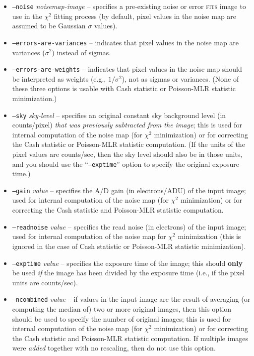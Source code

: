 \documentclass[10pt,a4paper,article]{memoir}
\newcommand{\chisquare}{\ensuremath{\chi^{2}}}
\begin{document}
\begin{itemize}
\item \texttt{--noise} \textit{noisemap-image} -- specifies a pre-existing noise
or error \textsc{fits} image to use in the \chisquare{} fitting process (by default, pixel values in the
noise map are assumed to be Gaussian $\sigma$ values).
\item \texttt{--errors-are-variances} -- indicates that pixel values in the noise
map are variances ($\sigma^2$) instead of sigmas.
\item \texttt{--errors-are-weights} -- indicates that pixel values in the noise
map should be interpreted as weights (e.g., $1/\sigma^2$), not as sigmas or variances. (None
of these three options is usable with Cash statistic or Poisson-MLR statistic minimization.)

\bigskip

\item \texttt{--sky} \textit{sky-level} -- specifies an original
constant sky background level (in counts/pixel) \textit{that was
previously subtracted from the image}; this is used for internal
computation of the noise map (for \chisquare{} minimization) or for
correcting the Cash statistic or Poisson-MLR statistic computation. (If
the units of the pixel values are counts/sec, then the sky level should
also be in those units, and you should use the ``\texttt{--exptime}''
option to specify the original exposure time.)

\item \texttt{--gain} \textit{value} -- specifies the A/D gain (in electrons/ADU)
of the input image; used for internal computation of the noise map (for \chisquare{}
minimization) or for correcting the Cash statistic and Poisson-MLR statistic computation.

\item \texttt{--readnoise} \textit{value} -- specifies the read noise (in electrons)
of the input image; used for internal computation of the noise map for \chisquare{}
minimization (this is ignored in the case of Cash statistic or Poisson-MLR statistic minimization).

\item \texttt{--exptime} \textit{value} -- specifies the exposure time of the image;
this should \textbf{only} be used \textit{if} the image has been divided by the exposure time
(i.e., if the pixel units are counts/sec).

\item \texttt{--ncombined} \textit{value} -- if values in the input
image are the result of averaging (or computing the median of) two or
more original images, then this option should be used to specify the
number of original images; this is used for internal computation of the noise map (for \chisquare{}
minimization) or for correcting the Cash statistic and Poisson-MLR statistic computation.  
If multiple images were \textit{added} together with no rescaling, then do not use this option.


\end{itemize}
\end{document}
